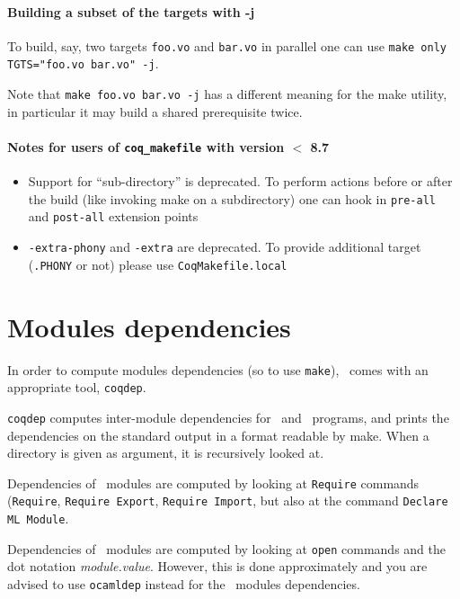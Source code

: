 \paragraph{Building a subset of the targets with -j} %

To build, say, two targets \texttt{foo.vo} and \texttt{bar.vo}
in parallel one can use \texttt{make only TGTS="foo.vo bar.vo" -j}.

Note that \texttt{make foo.vo bar.vo -j} has a different meaning for
the make utility, in particular it may build a shared prerequisite twice.

\paragraph{Notes for users of {\tt coq\_makefile} with version $<$ 8.7} %

\begin{itemize}
\item Support for ``sub-directory'' is deprecated.  To perform actions before
	or after the build (like invoking make on a subdirectory) one can
	hook in {\tt pre-all} and {\tt post-all} extension points
\item \texttt{-extra-phony} and \texttt{-extra} are deprecated.  To provide
	additional target ({\tt .PHONY} or not) please use
	{\tt CoqMakefile.local}
\end{itemize}


\section[Modules dependencies]{Modules dependencies\label{Dependencies}
  }

In order to compute modules dependencies (so to use {\tt make}),
\Coq\ comes with an appropriate tool, {\tt coqdep}.

{\tt coqdep} computes inter-module dependencies for \Coq\ and
\ocaml\ programs, and prints the dependencies on the standard
output in a format readable by make.  When a directory is given as
argument, it is recursively looked at.

Dependencies of \Coq\ modules are computed by looking at {\tt Require}
commands ({\tt Require}, {\tt Requi\-re Export}, {\tt Require Import},
but also at the command {\tt Declare ML Module}.

Dependencies of \ocaml\ modules are computed by looking at
\verb!open! commands and the dot notation {\em module.value}. However,
this is done approximately and you are advised to use {\tt ocamldep}
instead for the \ocaml\ modules dependencies.

